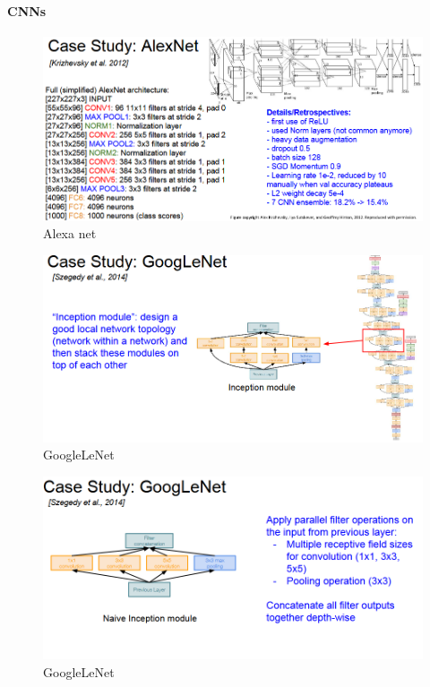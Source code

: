 \documentclass[11pt]{article}
\begin{document}
\paragraph{CNNs}

\begin{figure}[h]
\centering
\captionsetup{justification=centering}
\includegraphics[width=0.82\linewidth]{L810.pdf}
\caption{ Alexa net}
\label{fig:L810}
\end{figure}
\begin{figure}[h]
\centering
\captionsetup{justification=centering}
\includegraphics[width=1\linewidth]{L811.pdf}
\caption{ GoogleLeNet}
\label{fig:L811}
\end{figure}
\clearpage
\begin{figure}[h]
\centering
\captionsetup{justification=centering}
\includegraphics[width=0.9\linewidth]{L812.pdf}
\caption{ GoogleLeNet}
\label{fig:L812}
\end{figure}
\end{document}
